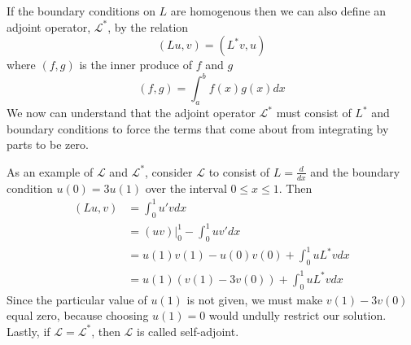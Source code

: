 If the boundary conditions on \(L\) are homogenous then we can also define an adjoint operator, \(\mathcal{L}^*\), by the relation
\begin{equation}
	(Lu,v) = (L^*v,u)
\end{equation}
where \((f,g)\) is the inner produce of \(f\) and \(g\)
\begin{equation}
	(f,g) = \int_a^bf(x)g(x)dx
\end{equation}
We now can understand that the adjoint operator \(\mathcal{L}^*\) must consist of \(L^*\) and boundary conditions to force the terms that come about from integrating by parts to be zero.

As an example of \(\mathcal{L}\) and \(\mathcal{L}^*\), consider \(\mathcal{L}\) to consist of \(L=\frac{d}{dx}\) and the boundary condition \(u(0)=3u(1)\) over the interval \(0\leq x \leq 1\). Then
\begin{equation}
	\begin{split}
		(Lu,v) &= \int_0^1u'vdx\\
		       &= (uv)\biggr\rvert_0^1 - \int_0^1 uv'dx\\
		       &= u(1)v(1)-u(0)v(0)+\int_0^1uL^*vdx\\
		       &= u(1)(v(1)-3v(0)) + \int_0^1uL^*vdx
	\end{split}
\end{equation}
Since the particular value of \(u(1)\) is not given, we must make \(v(1)-3v(0)\) equal zero, because choosing \(u(1)=0\) would undully restrict our solution. Lastly, if \(\mathcal{L}=\mathcal{L}^*\), then \(\mathcal{L}\) is called self-adjoint.
